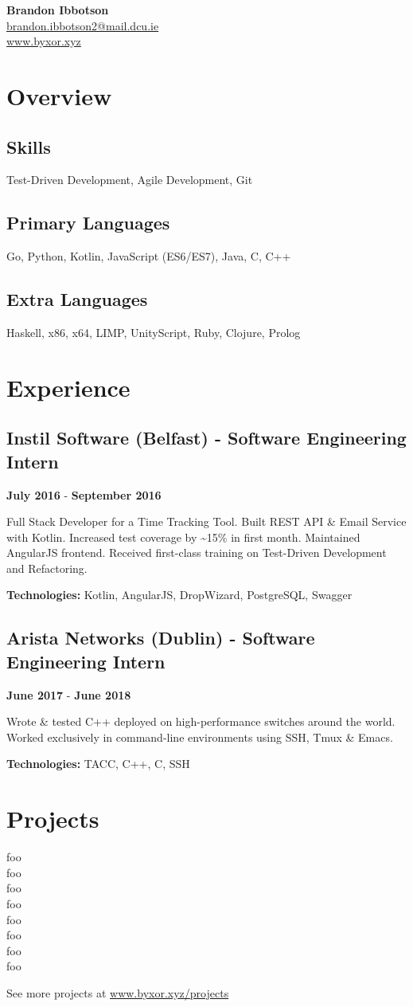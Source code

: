 \documentclass{article}
\newcommand{\youremail}[1]{\href{mailto:#1}{#1}}
\newcommand{\yourtitle}[3]{
  \begin{center}
    {\huge\bfseries #1}\\
    \vspace{.5em}
    \youremail{#2}\\
    \url{#3}\\
    \vspace{.7em}
  \end{center}
}
\begin{document}
\yourtitle{Brandon Ibbotson}{brandon.ibbotson2@mail.dcu.ie}{www.byxor.xyz}
\section{Overview}
\subsection{Skills}
Test-Driven Development, Agile Development, Git
\subsection{Primary Languages}
Go, Python, Kotlin, JavaScript (ES6/ES7), Java, C, C++
\subsection{Extra Languages}
Haskell, x86, x64, LIMP, UnityScript, Ruby, Clojure, Prolog
\section{Experience}
\subsection{Instil Software (Belfast) - Software Engineering Intern}
\textbf{July 2016} - \textbf{September 2016}

Full Stack Developer for a Time Tracking Tool. Built REST API \& Email Service with Kotlin. Increased test coverage by \textasciitilde{}15\% in first month. Maintained AngularJS frontend. Received first-class training on Test-Driven Development and Refactoring.

\textbf{Technologies: }Kotlin, AngularJS, DropWizard, PostgreSQL, Swagger
\vspace{0.5em}\subsection{Arista Networks (Dublin) - Software Engineering Intern}
\textbf{June 2017} - \textbf{June 2018}

Wrote \& tested C++ deployed on high-performance switches around the world. Worked exclusively in command-line environments using SSH, Tmux \& Emacs. 

\textbf{Technologies: }TACC, C++, C, SSH
\vspace{0.5em}
\section{Projects}
\begin{multicols}{2}
foo\\foo\\foo\\foo\\foo\\foo\\foo\\foo\\
\end{multicols}
\begin{center}
 See more projects at \url{www.byxor.xyz/projects}
\end{center}
\end{document}
